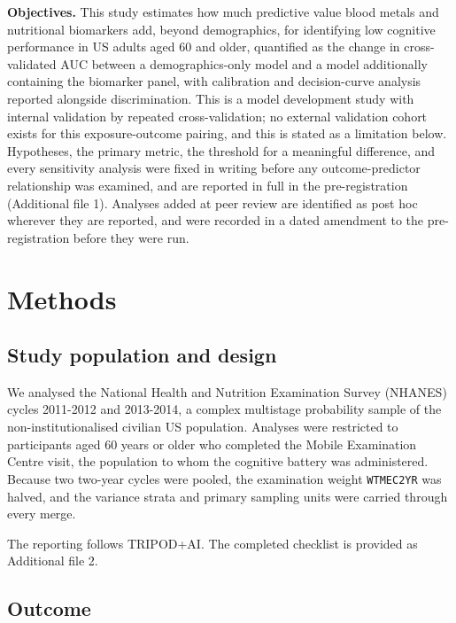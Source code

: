 \documentclass[12pt]{article}
\begin{document}
\textbf{Objectives.} This study estimates how much predictive value blood metals and nutritional biomarkers add, beyond demographics, for identifying low cognitive performance in US adults aged 60 and older, quantified as the change in cross-validated AUC between a demographics-only model and a model additionally containing the biomarker panel, with calibration and decision-curve analysis reported alongside discrimination. This is a model development study with internal validation by repeated cross-validation; no external validation cohort exists for this exposure-outcome pairing, and this is stated as a limitation below. Hypotheses, the primary metric, the threshold for a meaningful difference, and every sensitivity analysis were fixed in writing before any outcome-predictor relationship was examined, and are reported in full in the pre-registration (Additional file 1). Analyses added at peer review are identified as post hoc wherever they are reported, and were recorded in a dated amendment to the pre-registration before they were run.

\section*{Methods}

\subsection*{Study population and design}

We analysed the National Health and Nutrition Examination Survey (NHANES) cycles 2011-2012 and 2013-2014, a complex multistage probability sample of the non-institutionalised civilian US population. Analyses were restricted to participants aged 60 years or older who completed the Mobile Examination Centre visit, the population to whom the cognitive battery was administered. Because two two-year cycles were pooled, the examination weight \texttt{WTMEC2YR} was halved, and the variance strata and primary sampling units were carried through every merge.

The reporting follows TRIPOD+AI. The completed checklist is provided as Additional file 2.

\subsection*{Outcome}
\end{document}
